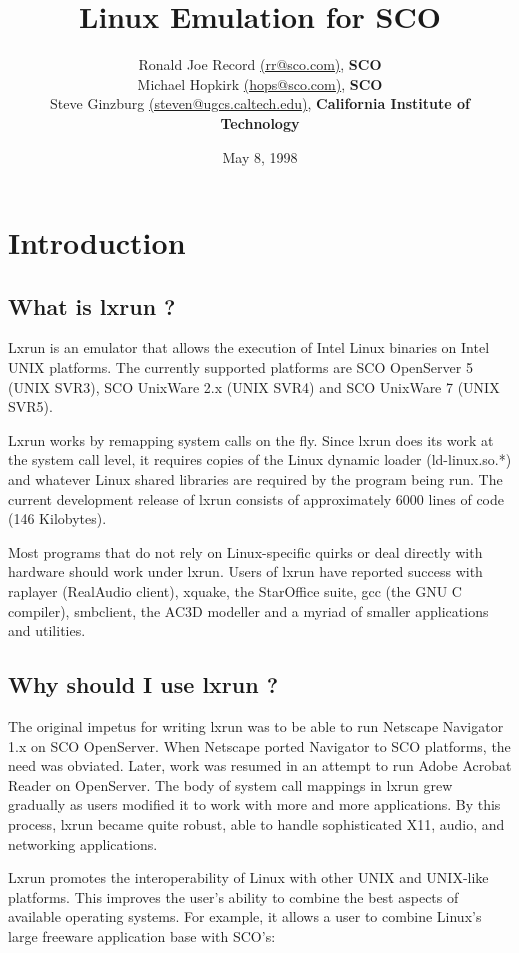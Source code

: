 \documentclass[letterpaper]{article}
\title{Linux Emulation for SCO}
\author{Ronald Joe Record
{\ttfamily \url{(rr@sco.com)}}, {\bfseries SCO}\\ 
Michael Hopkirk
{\ttfamily \url{(hops@sco.com)}}, {\bfseries SCO}\\ 
Steve Ginzburg
{\ttfamily \url{(steven@ugcs.caltech.edu)}}, {\bfseries California Institute of Technology}}
\date{May 8, 1998}
\begin{document}
\maketitle
\tableofcontents

\section{Introduction}




\subsection{What is lxrun ?}

Lxrun is an emulator that allows the execution of Intel Linux binaries on
Intel UNIX\rcircle{} platforms. The currently supported platforms are
SCO OpenServer 5 (UNIX SVR3), SCO UnixWare 2.x (UNIX SVR4) and 
SCO UnixWare 7 (UNIX SVR5).

Lxrun works by remapping system calls on the fly. Since lxrun does its work 
at the system call level, it requires copies of the Linux dynamic loader 
(ld-linux.so.*) and whatever Linux shared libraries are required by the 
program being run. The current development release of lxrun consists of
approximately 6000 lines of code (146 Kilobytes).

Most programs that do not rely on Linux-specific quirks
or deal directly with hardware should work under lxrun.
Users of lxrun have reported success with raplayer (RealAudio client),
xquake, the StarOffice suite, gcc (the GNU C compiler), smbclient,
the AC3D modeller and a myriad of smaller applications and utilities.




\subsection{Why should I use lxrun ?}

The original impetus for writing lxrun was to be able to run Netscape
Navigator 1.x on SCO OpenServer. When Netscape ported Navigator to SCO 
platforms, the need was obviated. Later, work was resumed in an attempt to 
run Adobe Acrobat Reader on OpenServer. The body of system call mappings in 
lxrun grew gradually as users modified it to work with more and more 
applications. By this process, lxrun became quite robust, able to handle 
sophisticated X11, audio, and networking applications.

Lxrun promotes the interoperability of Linux with other UNIX and
UNIX-like platforms. This improves the user's ability to
combine the best aspects of available operating systems. For
example, it allows a user to combine Linux's large freeware
application base with SCO's:
\end{document}
